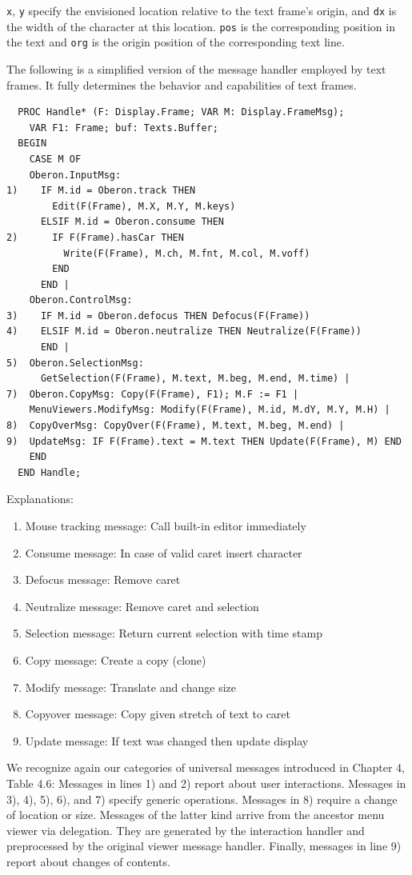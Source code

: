 \verb|x|, \verb|y| specify the envisioned location relative to the text frame's origin, and \verb|dx|
is the width of the character at this location. \verb|pos| is the corresponding position in the text
and \verb|org| is the origin position of the corresponding text line.

The following is a simplified version of the message handler employed by text frames. It fully
determines the behavior and capabilities of text frames.
\begin{verbatim}
  PROC Handle* (F: Display.Frame; VAR M: Display.FrameMsg);
    VAR F1: Frame; buf: Texts.Buffer;
  BEGIN
    CASE M OF
    Oberon.InputMsg:
1)    IF M.id = Oberon.track THEN
        Edit(F(Frame), M.X, M.Y, M.keys)
      ELSIF M.id = Oberon.consume THEN
2)      IF F(Frame).hasCar THEN
          Write(F(Frame), M.ch, M.fnt, M.col, M.voff)
        END
      END |
    Oberon.ControlMsg:
3)    IF M.id = Oberon.defocus THEN Defocus(F(Frame))
4)    ELSIF M.id = Oberon.neutralize THEN Neutralize(F(Frame))
      END |
5)  Oberon.SelectionMsg:
      GetSelection(F(Frame), M.text, M.beg, M.end, M.time) |
7)  Oberon.CopyMsg: Copy(F(Frame), F1); M.F := F1 |
    MenuViewers.ModifyMsg: Modify(F(Frame), M.id, M.dY, M.Y, M.H) |
8)  CopyOverMsg: CopyOver(F(Frame), M.text, M.beg, M.end) |
9)  UpdateMsg: IF F(Frame).text = M.text THEN Update(F(Frame), M) END
    END
  END Handle;
\end{verbatim}

Explanations:
\begin{enumerate}
  \item Mouse tracking message: Call built-in editor immediately
  \item Consume message: In case of valid caret insert character
  \item Defocus message: Remove caret
  \item Neutralize message: Remove caret and selection
  \item Selection message: Return current selection with time stamp
  \item Copy message: Create a copy (clone)
  \item Modify message: Translate and change size
  \item Copyover message: Copy given stretch of text to caret
  \item Update message: If text was changed then update display
\end{enumerate}

We recognize again our categories of universal messages introduced in Chapter 4, Table 4.6:
Messages in lines 1) and 2) report about user interactions. Messages in 3), 4), 5), 6), and 7) specify
generic operations. Messages in 8) require a change of location or size. Messages of the latter kind
arrive from the ancestor menu viewer via delegation. They are generated by the interaction handler
and preprocessed by the original viewer message handler. Finally, messages in line 9) report about
changes of contents.

